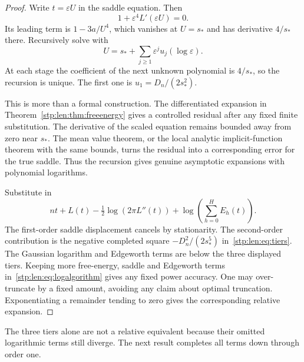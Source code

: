 \documentclass[11pt]{article}
\theoremstyle{remark}\newtheorem{remark}[theorem]{Remark}
\newcommand{\as}{s_*}\newcommand{\eps}{\varepsilon}\newcommand{\poc}[2]{(#1;#2)_\infty}
\begin{document}
\begin{proof}
Write $t=\eps U$ in the saddle equation. Then
\[
 1+\eps^4L'(\eps U)=0.
\]
Its leading term is $1-3a/U^4$, which vanishes at $U=\as$ and has derivative $4/\as$ there. Recursively solve with
\[
 U=\as+\sum_{j\ge1}\eps^ju_j(\log\eps).
\]
At each stage the coefficient of the next unknown polynomial is $4/\as$, so the recursion is unique. The first one is $u_1=D_n/(2\as^2)$.

This is more than a formal construction. The differentiated expansion in Theorem~\ref{stp:len:thm:freeenergy} gives a controlled residual after any fixed finite substitution. The derivative of the scaled equation remains bounded away from zero near $\as$. The mean value theorem, or the local analytic implicit-function theorem with the same bounds, turns the residual into a corresponding error for the true saddle. Thus the recursion gives genuine asymptotic expansions with polynomial logarithms.

Substitute in
\begin{equation}\label{stp:len:eq:logalgorithm}
 nt+L(t)-\tfrac12\log(2\pi L''(t))
 +\log\left(\sum_{h=0}^HE_h(t)\right).
\end{equation}
The first-order saddle displacement cancels by stationarity. The second-order contribution is the negative completed square $-D_n^2/(2\as^5)$ in~\eqref{stp:len:eq:tiers}. The Gaussian logarithm and Edgeworth terms are below the three displayed tiers. Keeping more free-energy, saddle and Edgeworth terms in~\eqref{stp:len:eq:logalgorithm} gives any fixed power accuracy. One may over-truncate by a fixed amount, avoiding any claim about optimal truncation. Exponentiating a remainder tending to zero gives the corresponding relative expansion.
\end{proof}

The three tiers alone are not a relative equivalent because their omitted logarithmic terms still diverge. The next result completes all terms down through order one.
\end{document}
